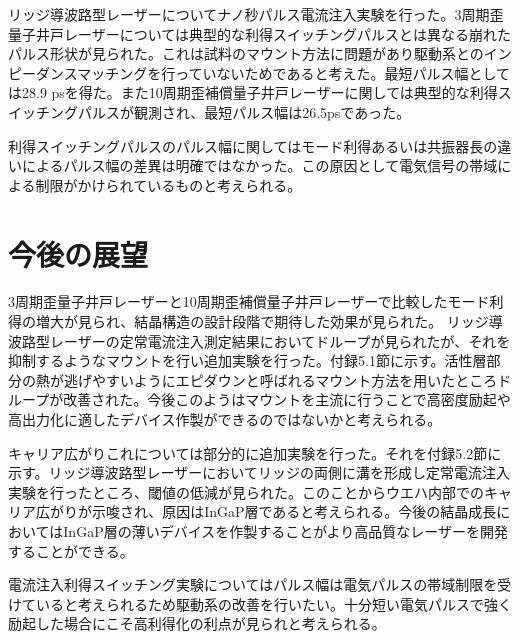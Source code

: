 リッジ導波路型レーザーについてナノ秒パルス電流注入実験を行った。3周期歪量子井戸レーザーについては典型的な利得スイッチングパルスとは異なる崩れたパルス形状が見られた。これは試料のマウント方法に問題があり駆動系とのインピーダンスマッチングを行っていないためであると考えた。最短パルス幅としては28.9 psを得た。また10周期歪補償量子井戸レーザーに関しては典型的な利得スイッチングパルスが観測され、最短パルス幅は26.5psであった。

利得スイッチングパルスのパルス幅に関してはモード利得あるいは共振器長の違いによるパルス幅の差異は明確ではなかった。この原因として電気信号の帯域による制限がかけられているものと考えられる。

\section{今後の展望}
3周期歪量子井戸レーザーと10周期歪補償量子井戸レーザーで比較したモード利得の増大が見られ、結晶構造の設計段階で期待した効果が見られた。
リッジ導波路型レーザーの定常電流注入測定結果においてドループが見られたが、それを抑制するようなマウントを行い追加実験を行った。付録5.1節に示す。活性層部分の熱が逃げやすいようにエピダウンと呼ばれるマウント方法を用いたところドループが改善された。今後このようはマウントを主流に行うことで高密度励起や高出力化に適したデバイス作製ができるのではないかと考えられる。

キャリア広がりこれについては部分的に追加実験を行った。それを付録5.2節に示す。リッジ導波路型レーザーにおいてリッジの両側に溝を形成し定常電流注入実験を行ったところ、閾値の低減が見られた。このことからウエハ内部でのキャリア広がりが示唆され、原因はInGaP層であると考えられる。今後の結晶成長においてはInGaP層の薄いデバイスを作製することがより高品質なレーザーを開発することができる。


電流注入利得スイッチング実験についてはパルス幅は電気パルスの帯域制限を受けていると考えられるため駆動系の改善を行いたい。十分短い電気パルスで強く励起した場合にこそ高利得化の利点が見られと考えられる。